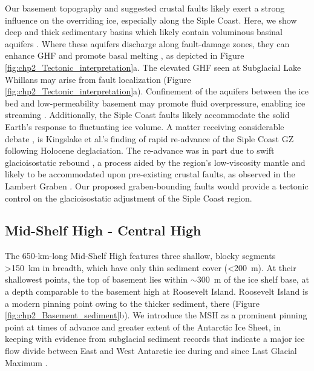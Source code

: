 Our basement topography and suggested crustal faults likely exert a strong influence on the overriding ice, especially along the Siple Coast. Here, we show deep and thick sedimentary basins which likely contain voluminous basinal aquifers \citep[Figure \ref{fig:chp2_Tectonic_interpretation}b; cf.][]{gustafsondynamic2022}. Where these aquifers discharge along fault-damage zones, they can enhance GHF and promote basal melting \citep{goochpotential2016}, as depicted in Figure \ref{fig:chp2_Tectonic_interpretation}a. The elevated GHF seen at Subglacial Lake Whillans \citep[285~mW/m\textsuperscript{2},][]{fisherhigh2015} may arise from fault localization (Figure \ref{fig:chp2_Tectonic_interpretation}a). Confinement of the aquifers between the ice bed and low-permeability basement may promote fluid overpressure, enabling ice streaming \citep[e.g.][]{ravierglaciohydrogeology2018}. Additionally, the Siple Coast faults likely accommodate the solid Earth's response to fluctuating ice volume. A matter receiving considerable debate \citep{neuhausdid2021, venturellimid2020, lowrydeglacial2019}, is Kingslake et al.'s \citeyear{kingslakeextensive2018} finding of rapid re-advance of the Siple Coast GZ following Holocene deglaciation. The re-advance was in part due to swift glacioisostatic rebound \citep[cf.][]{lowrygeologic2020, couloncontrasting2021}, a process aided by the region’s low-viscosity mantle \citep{whitehousesolid2019} and likely to be accommodated upon pre-existing crustal faults, as observed in the Lambert Graben \citep{phillipsbrittle2009}. Our proposed graben-bounding faults would provide a tectonic control on the glacioisostatic adjustment of the Siple Coast region.

\subsection{Mid-Shelf High - Central High}
The 650-km-long Mid-Shelf High features three shallow, blocky segments \textgreater150~km in breadth, which have only thin sediment cover (\textless200~m). At their shallowest points, the top of basement  lies within $\sim$300~m  of the ice shelf base, at a depth comparable to the basement high at Roosevelt Island. Roosevelt Island is a modern pinning point \citep{stillmechanical2019} owing to the thicker sediment, there (Figure \ref{fig:chp2_Basement_sediment}b). We introduce the MSH as a prominent pinning point at times of advance and greater extent of the Antarctic Ice Sheet, in keeping with evidence from subglacial sediment records that indicate a major ice flow divide between East and West Antarctic ice during and since Last Glacial Maximum \citep{liapatite2020, lichtupb2014, coenenpaleogene2019}. \\

